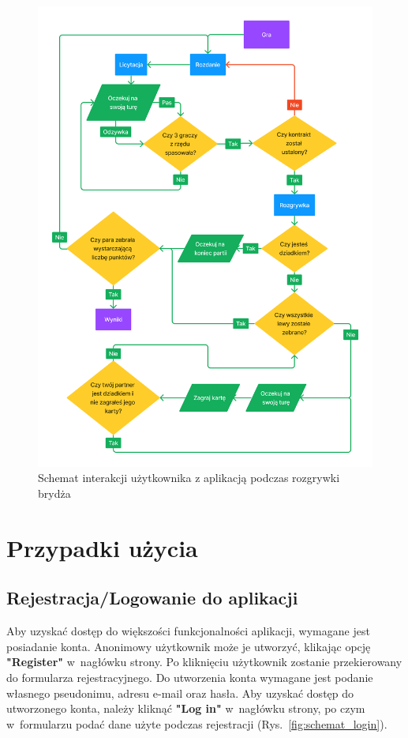\begin{figure}[h]
  \centering
  \includegraphics[width=\textwidth]{img/flow-aplikacji/game_flow.png}
  \caption{Schemat interakcji użytkownika z aplikacją podczas rozgrywki brydża}
  \label{fig:flow_game_flow}
\end{figure}

\FloatBarrier

\section{Przypadki użycia}

\subsection{Rejestracja/Logowanie do aplikacji}

Aby uzyskać dostęp do większości funkcjonalności aplikacji, wymagane
jest posiadanie konta. Anonimowy użytkownik może je utworzyć, klikając
opcję \textbf{"Register"} w~nagłówku strony. Po kliknięciu użytkownik
zostanie przekierowany do formularza rejestracyjnego.
Do utworzenia konta wymagane jest podanie własnego
pseudonimu, adresu e-mail oraz hasła. Aby uzyskać dostęp do utworzonego
konta, należy kliknąć \textbf{"Log in"} w~nagłówku strony, po czym
w~formularzu podać dane użyte podczas rejestracji (Rys.~\ref{fig:schemat_login}).

